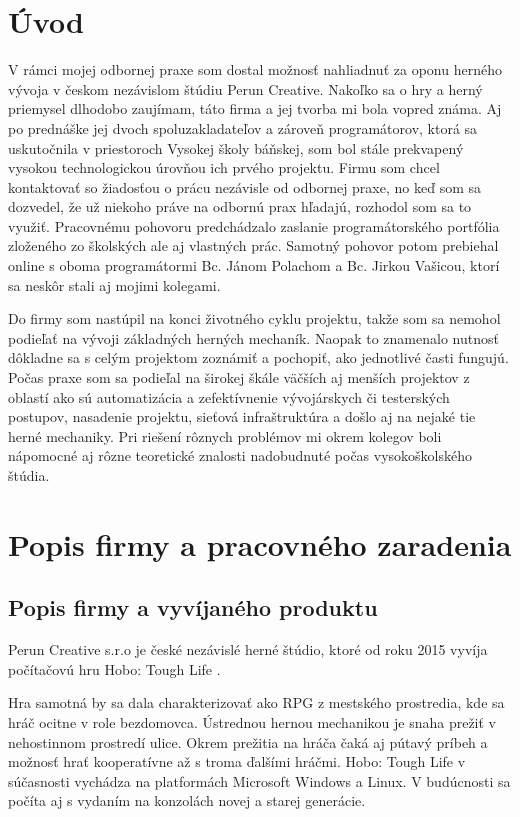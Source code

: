 \documentclass[slovak, bachelorpractice]{diploma}
\begin{document}
\MakeTitlePages

\chapter{Úvod}
\label{sec:Introduction}
V rámci mojej odbornej praxe som dostal možnosť nahliadnuť za oponu herného vývoja v českom nezávislom štúdiu Perun Creative. Nakoľko sa o hry a herný priemysel dlhodobo zaujímam, táto firma a jej tvorba mi bola vopred známa. Aj po prednáške jej dvoch spoluzakladateľov a zároveň programátorov, ktorá sa uskutočnila v priestoroch Vysokej školy báňskej, som bol stále prekvapený vysokou technologickou úrovňou ich prvého projektu. Firmu som chcel kontaktovať so žiadosťou o prácu nezávisle od odbornej praxe, no keď som sa dozvedel, že už niekoho práve na odbornú prax hľadajú, rozhodol som sa to využiť. Pracovnému pohovoru predchádzalo zaslanie programátorského portfólia zloženého zo školských ale aj vlastných prác. Samotný pohovor potom prebiehal online s oboma programátormi Bc. Jánom Polachom a Bc. Jirkou Vašicou, ktorí sa neskôr stali aj mojimi kolegami.

Do firmy som nastúpil na konci životného cyklu projektu, takže som sa nemohol podieľať na vývoji základných herných mechaník. Naopak to znamenalo nutnosť dôkladne sa s celým projektom zoznámiť a pochopiť, ako jednotlivé časti fungujú. Počas praxe som sa podieľal na širokej škále väčších aj menších projektov z oblastí ako sú automatizácia a zefektívnenie vývojárskych či testerských postupov, nasadenie projektu, sieťová infraštruktúra a došlo aj na nejaké tie herné mechaniky. Pri riešení rôznych problémov mi okrem kolegov boli nápomocné aj rôzne teoretické znalosti nadobudnuté počas vysokoškolského štúdia.

\chapter{Popis firmy a pracovného zaradenia}
\label{sec:Firm and me}
\section{Popis firmy a vyvíjaného produktu}
\label{sec:Firm}
Perun Creative s.r.o \cite{Perun} je české nezávislé herné štúdio, ktoré od roku 2015 vyvíja počítačovú hru Hobo: Tough Life \cite{Hobo}.

Hra samotná by sa dala charakterizovať ako RPG z mestského prostredia, kde sa hráč ocitne v role bezdomovca. Ústrednou hernou mechanikou je snaha prežiť v nehostinnom prostredí ulice. Okrem prežitia na hráča čaká aj pútavý príbeh a možnosť hrať kooperatívne až s troma ďalšími hráčmi. Hobo: Tough Life v súčasnosti vychádza na platformách Microsoft Windows a Linux. V budúcnosti sa počíta aj s vydaním na konzolách novej a starej generácie. 
\end{document}
